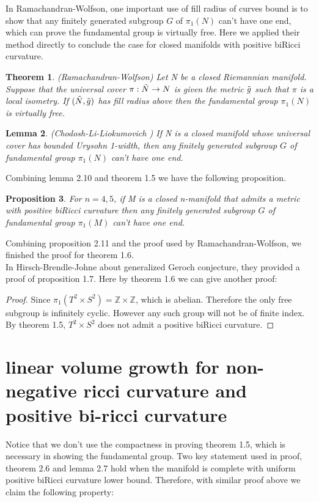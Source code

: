 \documentclass{amsart}
\newtheorem{theorem}{Theorem}[section]
\newtheorem{lemma}[theorem]{Lemma}
\newtheorem{proposition}[theorem]{Proposition}
\theoremstyle{definition}
\theoremstyle{remark}
\numberwithin{equation}{section}
\begin{document}
In Ramachandran-Wolfson\cite{mw09}, one important use of fill radius of curves bound is to show that any finitely generated subgroup $G$ of $\pi_{1}(N)$ can't have one end, which can prove the fundamental group is virtually free. Here we applied their method directly to conclude the case for closed manifolds with positive biRicci curvature. 

\begin{theorem}(Ramachandran-Wolfson\cite{mw09})
    Let N be a closed Riemannian manifold. Suppose that the universal cover $\pi:\Tilde{N}\rightarrow N$ is given the metric $\Tilde{g}$ such that $\pi$ is a local isometry. If $(\Tilde{N},\Tilde{g})$ has fill radius above then the fundamental group $\pi_{1}(N)$ is virtually free. 
\end{theorem}

\begin{lemma}(Chodosh-Li-Liokumovich \cite{cll23})
    If N is a closed manifold whose universal cover has bounded Urysohn 1-width, then any finitely generated subgroup $G$ of fundamental group $\pi_{1}(N)$ can't have one end. 
\end{lemma}
Combining lemma 2.10 and theorem 1.5 we have the following proposition. 
\begin{proposition}
 
    For $n=4,5$, if M is a closed n-manifold that admits a metric with positive biRicci curvature then any finitely generated subgroup $G$ of fundamental group $\pi_{1}(M)$ can't have one end. 
\end{proposition}


Combining proposition 2.11 and the proof used by Ramachandran-Wolfson, we finished the proof for theorem 1.6.\\

In Hirsch-Brendle-Johne\cite{ssa22} about generalized Geroch conjecture, they provided a proof of proposition 1.7. Here by theorem 1.6 we can give another proof:
\begin{proof}
 Since $\pi_{1}(T^{2}\times S^{2})=\mathbb{Z}\times \mathbb{Z}$, which is abelian. Therefore the only free subgroup is infinitely cyclic.  However any such group will not be of finite index. By theorem 1.5, $T^{2}\times S^{2}$ does not admit a positive biRicci curvature.
\end{proof}

\section{linear volume growth for non-negative ricci curvature and positive bi-ricci curvature}
Notice that we don't use the compactness in proving theorem 1.5, which is necessary in showing the fundamental group. Two key statement used in proof, theorem 2.6 and lemma 2.7 hold when the manifold is complete with uniform positive biRicci curvature lower bound. Therefore, with similar proof above we claim the following property:\\
\end{document}
